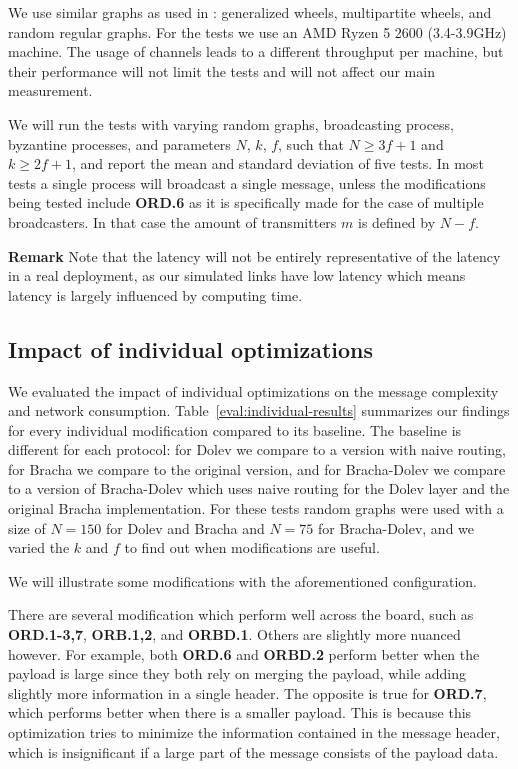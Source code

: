 We use similar graphs as used in \cite{bonomi2021practical,bonomi2019multihop}: generalized wheels, multipartite wheels, and random regular graphs. For the tests we use an AMD Ryzen 5 2600 (3.4-3.9GHz) machine. The usage of channels leads to a different throughput per machine, but their performance will not limit the tests and will not affect our main measurement.

We will run the tests with varying random graphs, broadcasting process, byzantine processes, and parameters $N$, $k$, $f$, such that $N \ge 3f+1$ and $k \ge 2f+1$, and report the mean and standard deviation of five tests. In most tests a single process will broadcast a single message, unless the modifications being tested include \textbf{ORD.6} as it is specifically made for the case of multiple broadcasters. In that case the amount of transmitters $m$ is defined by $N-f$.

\textbf{Remark}
Note that the latency will not be entirely representative of the latency in a real deployment, as our simulated links have low latency which means latency is largely influenced by computing time. 

\subsection{Impact of individual optimizations}
We evaluated the impact of individual optimizations on the message complexity and network consumption. Table~\ref{eval:individual-results} summarizes our findings for every individual modification compared to its baseline. The baseline is different for each protocol: for Dolev we compare to a version with naive routing, for Bracha we compare to the original version, and for Bracha-Dolev we compare to a version of Bracha-Dolev which uses naive routing for the Dolev layer and the original Bracha implementation. For these tests random graphs were used with a size of $N=150$ for Dolev and Bracha and $N=75$ for Bracha-Dolev, and we varied the $k$ and $f$ to find out when modifications are useful. 

We will illustrate some modifications with the aforementioned configuration.

There are several modification which perform well across the board, such as \textbf{ORD.1-3,7}, \textbf{ORB.1,2}, and \textbf{ORBD.1}. Others are slightly more nuanced however. For example, both \textbf{ORD.6} and \textbf{ORBD.2} perform better when the payload is large since they both rely on merging the payload, while adding slightly more information in a single header. The opposite is true for \textbf{ORD.7}, which performs better when there is a smaller payload. This is because this optimization tries to minimize the information contained in the message header, which is insignificant if a large part of the message consists of the payload data.

